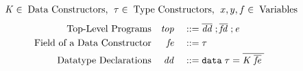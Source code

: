 \documentclass[acmsmall,review,anonymous]{acmart}\settopmatter{printfolios=true,printccs=false,printacmref=false}
\newcommand{\gramdef}{\; ::= \;}
\newcommand{\gramor}{\; | \;}
\newcommand{\keywd}[1]{\mathit{#1}}
\newcommand{\gramwd}[1]{\texttt{#1}}
\newcommand{\skeywd}[1]{\mathit{#1}}
\newcommand{\PROG}{\keywd{top}}
\newcommand{\DD}{\keywd{dd}}
\newcommand{\FD}{\keywd{fd}}
\newcommand{\DC}{\keywd{K}}
\newcommand{\fields}{\skeywd{fe}}
\newcommand{\EXPR}{\keywd{e}}
\newcommand{\DATA}{\gramwd{data}}
\newcommand{\TYP}{\keywd{\tau}}
\newcommand{\sTYP}{\skeywd{\tau}}
\newcommand{\var}{\svar}
\newcommand{\svar}{x}
\newcommand{\fvar}{\sfvar}
\newcommand{\sfvar}{f}
\newcommand{\yvar}{y}
\newcommand{\ARROW}{\rightarrow}
\newcommand{\letpack}[3]{\gramwd{let}\;#1=#2\;\gramwd{in}\;#3}
\newcommand{\fappnoloc}[1]{\fvar \; #1}
\newcommand{\pat}{\keywd{pat}}
\newcommand{\VAL}{\keywd{v}}
\newcommand{\caseclause}[2]{#1 \;\rightarrow \;#2}
\newcommand{\case}[2]{\gramwd{case}\; #1 \;\gramwd{of}\;#2}
\newcommand{\datacon}[3]{\ensuremath{#1 \;#2 \;#3}}
\newcommand{\dataconnoloc}[2]{\ensuremath{#1 \;#2}}
\newcommand{\vectorize}[1]{\overline{#1}}
\providecommand{\DIFaddbeginFL}{} %
\providecommand{\DIFdelbeginFL}{} %
\providecommand{\DIFdelendFL}{} %
\newcommand{\DIFscaledelfig}{0.5}
\newlength{\DIFdelgraphicswidth} %
\newlength{\DIFdelgraphicsheight} %
\newcommand{\DIFaddincludegraphics}[2][]{{\color{blue}\fbox{\DIFOincludegraphics[#1]{#2}}}} %
\newcommand{\DIFdelincludegraphics}[2][]{%
\sbox{\DIFdelgraphicsbox}{\DIFOincludegraphics[#1]{#2}}%
\settoboxwidth{\DIFdelgraphicswidth}{\DIFdelgraphicsbox} %
\settoboxtotalheight{\DIFdelgraphicsheight}{\DIFdelgraphicsbox} %
\scalebox{\DIFscaledelfig}{%
\parbox[b]{\DIFdelgraphicswidth}{\usebox{\DIFdelgraphicsbox}\\[-\baselineskip] \rule{\DIFdelgraphicswidth}{0em}}\llap{\resizebox{\DIFdelgraphicswidth}{\DIFdelgraphicsheight}{%
\setlength{\unitlength}{\DIFdelgraphicswidth}%
\begin{picture}(1,1)%
\thicklines\linethickness{2pt} %
{\color[rgb]{1,0,0}\put(0,0){\framebox(1,1){}}}%
{\color[rgb]{1,0,0}\put(0,0){\line( 1,1){1}}}%
{\color[rgb]{1,0,0}\put(0,1){\line(1,-1){1}}}%
\end{picture}%
}\hspace*{3pt}}} %
} %
\DeclareRobustCommand{\DIFaddbeginFL}{\DIFOaddbeginFL \let\includegraphics\DIFaddincludegraphics} %
\DeclareRobustCommand{\DIFdelbeginFL}{\DIFOdelbeginFL \let\includegraphics\DIFdelincludegraphics} %
\DeclareRobustCommand{\DIFdelendFL}{\DIFOaddendFL \let\includegraphics\DIFOincludegraphics} %
\begin{document}
\begin{figure}[]
	\small


\begin{displaymath}
  \begin{aligned}
  &\DC \in \; \textup{Data Constructors},\:\: \TYP \in \; \textup{Type Constructors},
  \:\: \var, \yvar,\fvar \in \; \textup{Variables}\end{aligned}
\end{displaymath}
\begin{displaymath}
  \DIFdelbeginFL %
\DIFdelendFL \DIFaddbeginFL \begin{aligned}
    \textup{Top-Level Programs} && \PROG && \gramdef & \vectorize{\DD} \;; \vectorize{\FD} \;; \EXPR \\
    \textup{Field of a Data Constructor} && \fields && \gramdef & \sTYP  \\
    \textup{Datatype Declarations} && \DD && \gramdef & \DATA\;\TYP = \vectorize{\DC \; \vectorize{\fields}\;} \\

\end{aligned}
\end{displaymath}
\end{figure}
\end{document}
